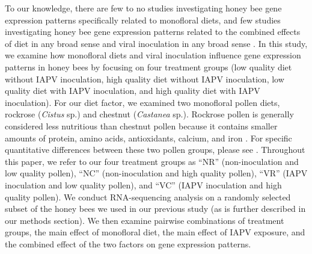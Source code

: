 \documentclass{bmcart}
\begin{document}
\begin{linenumbers}
\begin{doublespacing}
To our knowledge, there are few to no studies investigating honey bee gene expression patterns specifically related to monofloral diets, and few studies investigating honey bee gene expression patterns related to the combined effects of diet in any broad sense and viral inoculation in any broad sense \cite{interactingDV}. In this study, we examine how monofloral diets and viral inoculation influence gene expression patterns in honey bees by focusing on four treatment groups (low quality diet without IAPV inoculation, high quality diet without IAPV inoculation, low quality diet with IAPV inoculation, and high quality diet with IAPV inoculation). For our diet factor, we examined two monofloral pollen diets, rockrose (\textit{Cistus} sp.) and chestnut (\textit{Castanea} sp.). Rockrose pollen is generally considered less nutritious than chestnut pollen because it contains smaller amounts of protein, amino acids, antioxidants, calcium, and iron \cite{adamInt, DiPasquale}. For specific quantitative differences between these two pollen groups, please see \cite{DiPasquale}. Throughout this paper, we refer to our four treatment groups as ``NR'' (non-inoculation and low quality pollen), ``NC'' (non-inoculation and high quality pollen), ``VR'' (IAPV inoculation and low quality pollen), and ``VC'' (IAPV inoculation and high quality pollen). We conduct RNA-sequencing analysis on a randomly selected subset of the honey bees we used in our previous study (as is further described in our methods section). We then examine pairwise combinations of treatment groups, the main effect of monofloral diet, the main effect of IAPV exposure, and the combined effect of the two factors on gene expression patterns.


\end{doublespacing}
\end{linenumbers}
\end{document}
